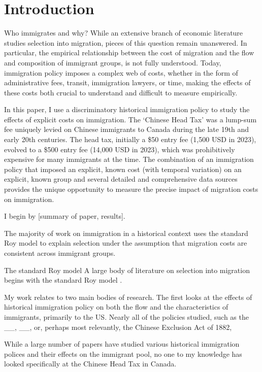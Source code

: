 \section{Introduction}
Who immigrates and why? While an extensive branch of economic literature studies selection into migration, pieces of this question remain unanswered. In particular, the empirical relationship between the cost of migration and the flow and composition of immigrant groups, is not fully understood. Today, immigration policy imposes a complex web of costs, whether in the form of administrative fees, transit, immigration lawyers, or time, making the effects of these costs both crucial to understand and difficult to measure empirically. 

In this paper, I use a discriminatory historical immigration policy to study the effects of explicit costs on immigration. The `Chinese Head Tax' was a lump-sum fee uniquely levied on Chinese immigrants to Canada during the late 19th and early 20th centuries. The head tax, initially a \$50 entry fee (1,500 USD in 2023), evolved to a \$500 entry fee (14,000 USD in 2023), which was prohibitively expensive for many immigrants at the time. The combination of an immigration policy that imposed an explicit, known cost (with temporal variation) on an explicit, known group and several detailed and comprehensive data sources provides the unique opportunity to measure the precise impact of migration costs on immigration. 

I begin by [summary of paper, results].

The majority of work on immigration in a historical context uses the standard Roy model to explain selection under the assumption that migration costs are consistent across immigrant groups. 

The standard Roy model \citet{roy1951} 
A large body of literature on selection into migration begins with the standard Roy model \citet{roy1951}. 



My work relates to two main bodies of research. The first looks at the effects of historical immigration policy on both the flow and the characteristics of immigrants, primarily to the US. Nearly all of the policies studied, such as the __, __, or, perhaps most relevantly, the Chinese Exclusion Act of 1882,  

While a large number of papers have studied various historical immigration polices and their effects on the immigrant pool, no one to my knowledge has looked specifically at the Chinese Head Tax in Canada. 

